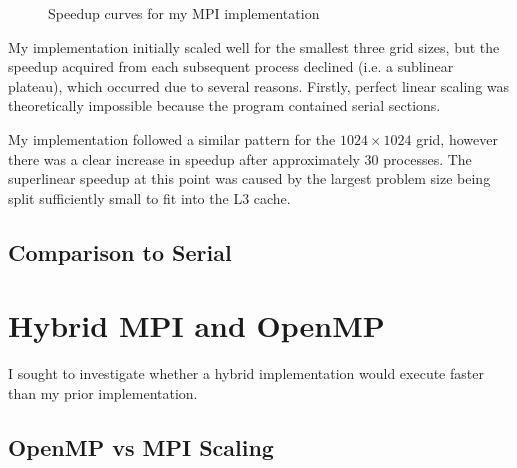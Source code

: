 \documentclass[twocolumn, a4paper]{article}
\begin{document}
\begin{figure}[htpb]
{
  }
  \caption{Speedup curves for my MPI implementation}\label{fig:scaling}
\end{figure}

My implementation initially scaled well for the smallest three grid sizes, but the speedup acquired from each subsequent process declined (i.e. a sublinear plateau), which occurred due to several reasons.
Firstly, perfect linear scaling was theoretically impossible because the program contained serial sections.

My implementation followed a similar pattern for the $1024 \times 1024$ grid, however there was a clear increase in speedup after approximately 30 processes.
The superlinear speedup at this point was caused by the largest problem size being split sufficiently small to fit into the L3 cache.

\subsection{Comparison to Serial}

\section{Hybrid MPI and OpenMP}

I sought to investigate whether a hybrid implementation would execute faster than my prior implementation.

\subsection{OpenMP vs MPI Scaling}
\end{document}
